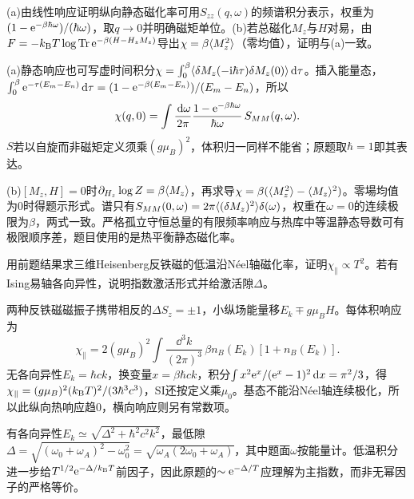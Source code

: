 \begin{exercise}[原题1(a)--(b)]\label{p:512-10-1}
(a)由线性响应证明纵向静态磁化率可用$S_{zz}(q,\omega)$的频谱积分表示，权重为$(1-\mathrm e^{-\beta\hbar\omega})/(\hbar\omega)$，取$q\to0$并明确磁矩单位。(b)若总磁化$M_z$与$H$对易，由$F=-k_{\mathrm B} T\log\operatorname{Tr}\mathrm e^{-\beta(H-H_zM_z)}$导出$\chi=\beta\langle M_z^2\rangle$（零均值），证明与(a)一致。
\end{exercise}
\begin{solution}
(a)静态响应也可写虚时间积分$\chi=\int_0^\beta\langle \delta M_z(-\mathrm i\hbar\tau)\delta M_z(0)\rangle\,\mathrm d\tau$。插入能量态，$\int_0^\beta\mathrm e^{-\tau(E_m-E_n)}\,\mathrm d\tau=(1-\mathrm e^{-\beta(E_m-E_n)})/(E_m-E_n)$，所以
\begin{equation}
\chi(q,0)=\int\frac{\,\mathrm d\omega}{2\pi}\frac{1-\mathrm e^{-\beta\hbar\omega}}{\hbar\omega}\,S_{MM}(q,\omega).
\end{equation}
$S$若以自旋而非磁矩定义须乘$(g\mu_B)^2$，体积归一同样不能省；原题取$\hbar=1$即其表达。

(b)$[M_z,H]=0$时$\partial_{H_z}\log Z=\beta\langle M_z\rangle$，再求导$\chi=\beta(\langle M_z^2\rangle-\langle M_z\rangle^2)$。零場均值为0时得题示形式。谱只有$S_{MM}(0,\omega)=2\pi\langle (\delta M_z)^2\rangle\delta(\omega)$，权重在$\omega=0$的连续极限为$\beta$，两式一致。严格孤立守恒总量的有限频率响应与热库中等温静态导数可有极限顺序差，题目使用的是热平衡静态磁化率。
\end{solution}
\begin{exercise}[原题1(a)--(b)]\label{p:512-11-1}
用前题结果求三维Heisenberg反铁磁的低温沿Néel轴磁化率，证明$\chi_\parallel\propto T^2$。若有Ising易轴各向异性，说明指数激活形式并给激活隙$\Delta$。
\end{exercise}
\begin{solution}
两种反铁磁磁振子携带相反的$\Delta S_z=\pm1$，小纵场能量移$E_k\mp g\mu_BH$。每体积响应为
\begin{equation}
\chi_\parallel=2(g\mu_B)^2\int\frac{\dd^3k}{(2\pi)^3}\,\beta n_B(E_k)[1+n_B(E_k)].
\end{equation}
无各向异性$E_k=\hbar ck$，换变量$x=\beta\hbar ck$，积分$\int x^2\mathrm e^x/(\mathrm e^x-1)^2\,\mathrm d x=\pi^2/3$，得$\chi_\parallel=(g\mu_B)^2(k_{\mathrm B} T)^2/(3\hbar^3c^3)$，SI还按定义乘$\mu_0$。基态不能沿Néel轴连续极化，所以此纵向热响应趋0，横向响应则另有常数项。

有各向异性$E_k\simeq\sqrt{\Delta^2+\hbar^2c^2k^2}$，最低隙$\Delta=\sqrt{(\omega_0+\omega_A)^2-\omega_0^2}=\sqrt{\omega_A(2\omega_0+\omega_A)}$，其中题面$\omega$按能量计。低温积分进一步给$T^{1/2}\mathrm e^{-\Delta/k_{\mathrm B} T}$前因子，因此原题的$\sim\mathrm e^{-\Delta/T}$应理解为主指数，而非无幂因子的严格等价。
\end{solution}
